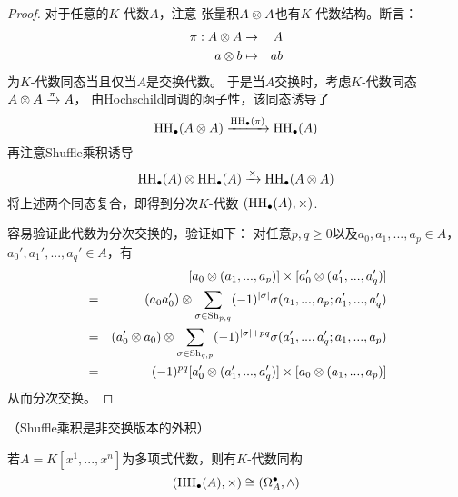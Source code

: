 \begin{proof}对于任意的$K$-代数$A$，注意
张量积$A\otimes A$也有$K$-代数结构。断言：
\begin{eqnarray*}
\pi:A\otimes A&\to& A\\
a\otimes b&\mapsto& ab
\end{eqnarray*}
为$K$-代数同态当且仅当$A$是交换代数。
于是当$A$交换时，考虑$K$-代数同态$A\otimes A\xrightarrow{\pi}A$，
由Hochschild同调的函子性，该同态诱导了
$$\operatorname{HH}_{\bullet}(A\otimes A)\xrightarrow{\operatorname{HH}_{\bullet}(\pi)}\operatorname{HH}_{\bullet}(A)$$
再注意Shuffle乘积诱导
$$\operatorname{HH}_{\bullet}(A)\otimes\operatorname{HH}_{\bullet}(A)\xrightarrow{\times}\operatorname{HH}_{\bullet}(A\otimes A)$$
将上述两个同态复合，即得到分次$K$-代数
$(\operatorname{HH}_{\bullet}(A),\times)$.

容易验证此代数为分次交换的，验证如下：
对任意$p,q\geq 0$以及$a_0,a_1,...,a_p\in A$，
$a_0',a_1',...,a_q'\in A$，有
\begin{eqnarray*}
& &
     [a_0\otimes(a_1,...,a_p)]
     \times[a_0'\otimes(a_1',...,a_q')]\\
&=&
     (a_0a_0')\otimes
     \sum_{\sigma\in\operatorname{Sh}_{p,q}}(-1)^{|\sigma|}
       \sigma(a_1,...,a_p;a_1',...,a_q')\\
&=&
     (a_0'\otimes a_0)\otimes
     \sum_{\sigma\in\operatorname{Sh}_{q,p}}
       (-1)^{|\sigma|+pq}
       \sigma(a_1',...,a_q';a_1,...,a_p)\\
&=&
     (-1)^{pq}
     [a_0'\otimes(a_1',...,a_q')]
     \times[a_0\otimes(a_1,...,a_p)]
\end{eqnarray*}
从而分次交换。
\end{proof}

\begin{prop}（Shuffle乘积是非交换版本的外积）

若$A=K[x^1,...,x^n]$为多项式代数，则有$K$-代数同构
$$(\operatorname{HH}_{\bullet}(A),\times)\cong(\Omega_A^{\bullet},\wedge)$$
\end{prop}

